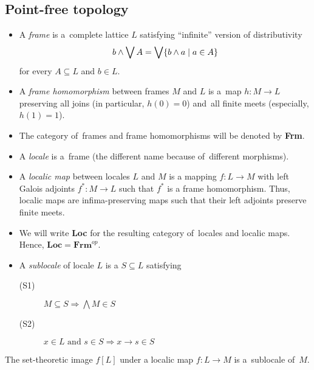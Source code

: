 \subsection*{Point-free topology}

\begin{itemize}
\item A \emph{frame} is a~complete lattice $L$ satisfying ``infinite'' version
of distributivity
\[
  b \wedge \bigvee A = \bigvee \{ b \wedge a \mid a\in A \}
\]
for every $A\subseteq L$ and $b\in L$.

\item A \emph{frame homomorphism} between frames $M$ and $L$ is a~map $h\colon
M \to L$ preserving all joins (in particular, $h(0) = 0$) and~all finite meets
(especially, $h(1) = 1$).

\item The category of~frames and frame homomorphisms will be denoted by {\bf
Frm}.

\item A \emph{locale} is a~frame (the different name because of~different
morphisms).

\item A \emph{localic map} between locales $L$ and $M$ is a mapping $f\colon L
\to M$ with left Galois adjoints $f^*\colon M \to L$ such that $f^*$ is a frame
homomorphism.
Thus, localic maps are infima-preserving maps such that their left adjoints
preserve finite meets.

\item We will write {\bf Loc} for the resulting category of~locales and localic
maps.
Hence, $\mathbf{Loc} = \mathbf{Frm}^{op}$.

\item A \emph{sublocale} of locale $L$ is a $S\subseteq L$ satisfying
  \begin{description}
  \item[(S1)] $M\subseteq S \Longrightarrow \bigwedge M\in S$
  \item[(S2)] $x\in L \text{ and } s\in S \Longrightarrow x \rightarrow s \in S$ 
  \end{description}
\end{itemize}

\begin{fact}
  The set-theoretic image $f[L]$ under a localic map $f\colon L\to M$
  is a~sublocale of~$M$.
\end{fact}

